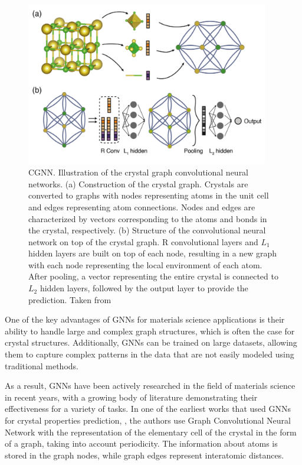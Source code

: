 \begin{figure}[H]
    \noindent
    \centering
    \includegraphics[width=10.6cm]{figures/CGCNN.png}
    \caption{CGNN. Illustration of the crystal graph convolutional neural networks. (a) Construction of the crystal graph. Crystals are converted to graphs with nodes representing atoms in the unit cell and edges representing atom connections. Nodes and edges are characterized by vectors corresponding to the atoms and bonds in the crystal, respectively. (b) Structure of the convolutional neural network on top of the crystal graph. R convolutional layers and $L_1$ hidden layers are built on top of each node, resulting in a new graph with each node representing the local environment of each atom. After pooling, a vector representing the entire crystal is connected to $L_2$ hidden layers, followed by the output layer to provide the prediction. Taken from \cite{xie2018crystal}}
    \label{fig:cgnn}
\end{figure}

One of the key advantages of GNNs for materials science applications is their ability to handle large and complex graph structures, which is often the case for crystal structures. Additionally, GNNs can be trained on large datasets, allowing them to capture complex patterns in the data that are not easily modeled using traditional methods.

As a result, GNNs have been actively researched in the field of materials science in recent years, with a growing body of literature demonstrating their effectiveness for a variety of tasks. In one of the earliest works that used GNNs for crystal properties prediction, \cite{xie2018crystal}, the authors use Graph Convolutional Neural Network with the representation of the elementary cell of the crystal in the form of a graph, taking into account periodicity. The information about atoms is stored in the graph nodes, while graph edges represent interatomic distances.

